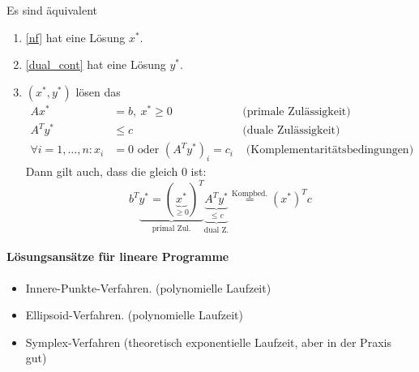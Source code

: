 \begin{lemma} \label{thm:starke_dualitat}
  Es sind äquivalent
  \begin{enumerate}
    \item \eqref{nf} hat eine Lösung $x^*$.
    \item \eqref{dual_cont} hat eine Lösung $y^*$.
    \item $(x^*,y^*)$ lösen das 
      \begin{align*}
        Ax^* &= b , \ x^* \geq 0 & \text{(primale Zulässigkeit)}\\
        A^{T} y^* &\leq c & \text{(duale Zulässigkeit)}\\
        \forall i = 1,\dots , n: x_{i}&= 0 \text{ oder } \left(A^{T}y^*  \right)_{i} = c_{i} & \text{ (Komplementaritätsbedingungen)}
      \end{align*}
      Dann gilt auch, dass die  gleich $0$ ist:
      \begin{equation*}
        b^{T}\underbrace{y^* = (\underbrace{x^*}_{\geq 0})^{T}}_{\text{primal Zul.}} \underbrace{\underbrace{A^{T} y^*}_{\leq c }}_{\text{dual Z.}} \stackrel{\text{Kompbed.}}= \left(x^*\right)^{T} c
      \end{equation*}
    \end{enumerate}
\end{lemma} %
\paragraph{Lösungsansätze für lineare Programme}
\begin{itemize}
  \item Innere-Punkte-Verfahren. (polynomielle Laufzeit)
  \item Ellipsoid-Verfahren. (polynomielle Laufzeit)
  \item Symplex-Verfahren (theoretisch exponentielle Laufzeit, aber in der Praxis gut)
\end{itemize}
